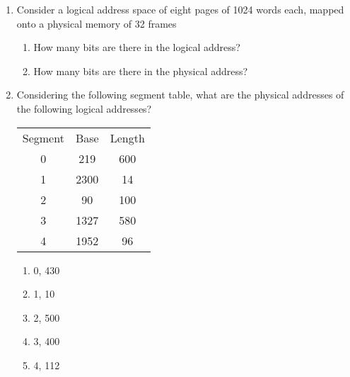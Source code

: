 \documentclass{article}
\begin{document}
\begin{enumerate}
\begin{enumerate}
		\end{enumerate}
		\item Consider a logical address space of eight pages of 1024 words each, mapped onto a physical memory of 32 frames
		\begin{enumerate}
			\item How many bits are there in the logical address?
			\item How many bits are there in the physical address?
		\end{enumerate}
		\item Considering the following segment table, what are the physical addresses of the following logical addresses?
		\begin{table*}[h]
			\centering
			\begin{tabular}{ccc}
				Segment & Base & Length \\
				0       & 219  & 600    \\
				1       & 2300 & 14     \\
				2       & 90   & 100    \\
				3       & 1327 & 580    \\
				4       & 1952 & 96     \\
			\end{tabular}
		\end{table*}
		\begin{multicols}{2}
			\begin{enumerate}
				\item 0, 430
				\item 1, 10
				\item 2, 500
				\item 3, 400
				\item 4, 112\\
			\end{enumerate}
		\end{multicols}
	\end{enumerate}
\end{document}
